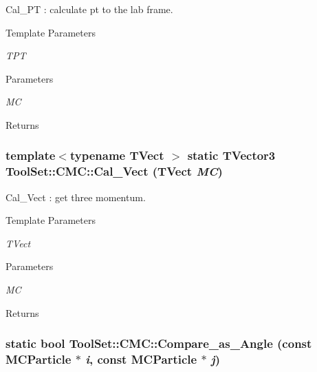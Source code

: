 Cal\_\-PT : calculate pt to the lab frame. 
\begin{DoxyTemplParams}{Template Parameters}
\item[{\em TPT}]\end{DoxyTemplParams}

\begin{DoxyParams}{Parameters}
\item[{\em MC}]\end{DoxyParams}
\begin{DoxyReturn}{Returns}

\end{DoxyReturn}
\hypertarget{classToolSet_1_1CMC_a679d9af4f1004560f178ed10f1a3028c}{
\subsubsection[{Cal\_\-Vect}]{\setlength{\rightskip}{0pt plus 5cm}template$<$typename TVect $>$ static TVector3 ToolSet::CMC::Cal\_\-Vect (TVect {\em MC})}}
\label{classToolSet_1_1CMC_a679d9af4f1004560f178ed10f1a3028c}


Cal\_\-Vect : get three momentum. 
\begin{DoxyTemplParams}{Template Parameters}
\item[{\em TVect}]\end{DoxyTemplParams}

\begin{DoxyParams}{Parameters}
\item[{\em MC}]\end{DoxyParams}
\begin{DoxyReturn}{Returns}

\end{DoxyReturn}
\hypertarget{classToolSet_1_1CMC_a4043b9e78a5178c2d8fba7f6543a7e65}{
\subsubsection[{Compare\_\-as\_\-Angle}]{\setlength{\rightskip}{0pt plus 5cm}static bool ToolSet::CMC::Compare\_\-as\_\-Angle (const MCParticle $\ast$ {\em i}, \/  const MCParticle $\ast$ {\em j})}}
\label{classToolSet_1_1CMC_a4043b9e78a5178c2d8fba7f6543a7e65}


